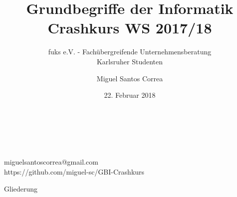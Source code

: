\documentclass[18pt]{beamer}
\title[GBI Crashkurs]{Grundbegriffe der Informatik\\ Crashkurs WS 2017/18}
\subtitle{fuks e.V. - Fachübergreifende Unternehmensberatung\\ Karlsruher Studenten}
\author{Miguel Santos Correa}
\date{22. Februar 2018}
\makeatletter
\newcommand*{\currentname}{\@currentlabelname}
\makeatother
\begin{document}


\begin{frame}
  \begin{center}
    \huge\inserttitle\\
    \vskip 1.75mm
    \normalsize
    \insertsubtitle\\
    \vskip 1.75mm
    \insertauthor\\
    \vskip 1.75mm
    \large
    miguelsantoscorrea@gmail.com\\
    \vskip 1.75mm
    https://github.com/miguel-sc/GBI-Crashkurs
  \end{center}
\end{frame}

\begin{frame}{Gliederung}
  \tableofcontents
\end{frame}

\AtBeginSection[]
{
  \begin{frame}
    \begin{center}
      \huge \currentname
    \end{center}
  \end{frame}
}






\end{document}
